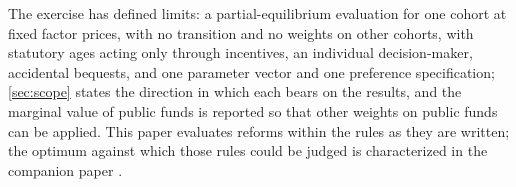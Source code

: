 The exercise has defined limits: a partial-equilibrium evaluation for one cohort at fixed factor prices, with no transition and no weights on other cohorts, with statutory ages acting only through incentives, an individual decision-maker, accidental bequests, and one parameter vector and one preference specification; \autoref{sec:scope} states the direction in which each bears on the results, and the marginal value of public funds is reported so that other weights on public funds can be applied. This paper evaluates reforms within the rules as they are written; the optimum against which those rules could be judged is characterized in the companion paper \citep{ndiaye2026flexible}.
